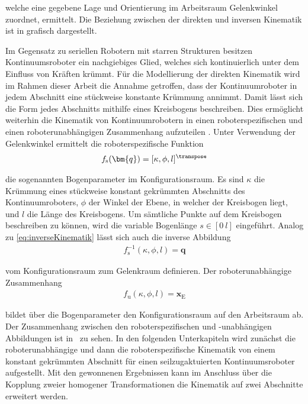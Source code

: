 welche eine gegebene Lage und Orientierung im Arbeitsraum Gelenkwinkel zuordnet, ermittelt. Die Beziehung zwischen der direkten und inversen Kinematik ist in  grafisch dargestellt. 

Im Gegensatz zu seriellen Robotern mit starren Strukturen besitzen Kontinuumsroboter ein nachgiebiges Glied, welches sich kontinuierlich unter dem Einfluss von Kräften krümmt. Für die Modellierung der direkten Kinematik wird im Rahmen dieser Arbeit die Annahme getroffen, dass der Kontinuumroboter in jedem Abschnitt eine stückweise konstante Krümmung annimmt. Damit lässt sich die Form jedes Abschnitts mithilfe eines Kreisbogens beschreiben. Dies ermöglicht weiterhin die Kinematik von Kontinuumrobotern in einen roboterspezifischen und einen roboterunabhängigen Zusammenhang aufzuteilen \cite{WIJ10}. Unter Verwendung der Gelenkwinkel ermittelt die roboterspezifische Funktion
%
\begin{align}
f_{\mathrm{s}}(\bm{q}) = [\kappa, \phi, l]^\transpose
\label{eq:fspezifisch}
\end{align}

die sogenannten Bogenparameter im Konfigurationsraum. Es sind $\kappa$ die Krümmung eines stückweise konstant gekrümmten Abschnitts des Kontinuumroboters, $\phi$ der Winkel der Ebene, in welcher der Kreisbogen liegt, und $l$ die Länge des Kreisbogens. Um sämtliche Punkte auf dem Kreisbogen beschreiben zu können, wird die variable Bogenlänge $s \in [0~l]$ eingeführt. Analog zu \eqref{eq:inverseKinematik} lässt sich auch die inverse Abbildung
%
\begin{align}
f^{-1}_{\mathrm{s}}(\kappa, \phi, l) = \bm{q}
\label{eq:fspezifischinvers}
\end{align}

vom Konfigurationsraum zum Gelenkraum definieren. Der roboterunabhängige Zusammenhang 
%
\begin{align}
f_{\text{u}}(\kappa, \phi, l) = \bm{x}_\mathrm{E}
\label{eq:funabhängig}
\end{align}

bildet über die Bogenparameter den Konfigurationsraum auf den Arbeitsraum ab. Der Zusammenhang zwischen den roboterspezifischen und -unabhängigen Abbildungen ist in~ zu sehen. In den folgenden Unterkapiteln wird zunächst die roboterunabhängige und dann die roboterspezifische Kinematik von einem konstant gekrümmten Abschnitt für einen seilzugaktuierten Kontinuumsroboter aufgestellt. Mit den gewonnenen Ergebnissen kann im Anschluss über die Kopplung zweier homogener Transformationen die Kinematik auf zwei Abschnitte erweitert werden. \\

